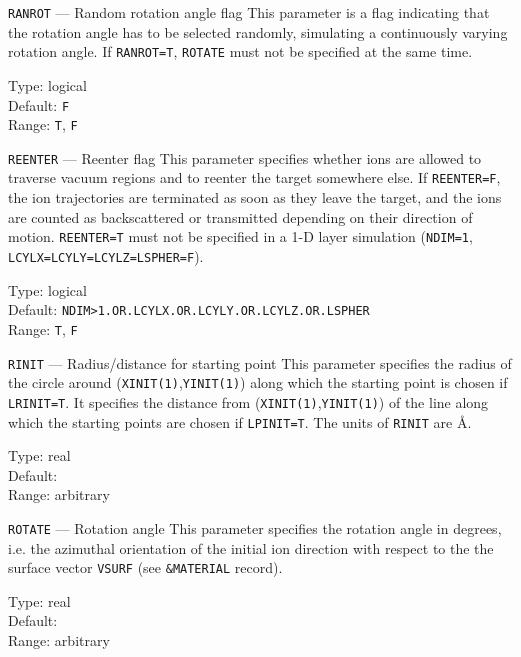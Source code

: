 \begin{keydescription}{\texttt{RANROT} --- Random rotation angle flag}
%
  This parameter is a flag indicating that the rotation angle has to be
  selected randomly, simulating a continuously varying rotation angle.
  If \texttt{RANROT=T}, \texttt{ROTATE} must not be specified at the
  same time.
%
  \begin{keytab}
    Type:    \> logical \\
    Default: \> \texttt{F} \\
    Range:   \> \texttt{T}, \texttt{F}
  \end{keytab}
\end{keydescription}

\begin{keydescription}{\texttt{REENTER} --- Reenter flag}
%
  This parameter specifies whether ions are allowed to traverse 
  vacuum regions and to reenter the target somewhere else. If
  \texttt{REENTER=F}, the ion trajectories are terminated as soon
  as they leave the target, and the ions are counted as backscattered or
  transmitted depending on their direction of motion. \texttt{REENTER=T} 
  must not be specified in a 1-D layer simulation (\texttt{NDIM=1},
  \texttt{LCYLX=LCYLY=LCYLZ=LSPHER=F}).
%
  \begin{keytab}
    Type:    \> logical \\
    Default: \>
    \texttt{NDIM>1.OR.LCYLX.OR.LCYLY.OR.LCYLZ.OR.LSPHER} \\
    Range:   \> \texttt{T}, \texttt{F}
  \end{keytab}
\end{keydescription}

\ifprivate
\begin{keydescription}{\texttt{RINIT} --- Radius/distance for starting point}
%
  This parameter specifies the radius of the circle around
  (\texttt{XINIT(1)},\texttt{YINIT(1)}) along which the starting point is
  chosen if \texttt{LRINIT=T}. It specifies the distance from
  (\texttt{XINIT(1)},\texttt{YINIT(1)}) of the line along which the starting
  points are chosen if \texttt{LPINIT=T}. The units of \texttt{RINIT}
  are \AA.
%
  \begin{keytab}
    Type:    \> real \\
    Default:  \\
    Range:   \> arbitrary
  \end{keytab}
\end{keydescription}
\fi

\begin{keydescription}{\texttt{ROTATE} --- Rotation angle}
%
  This parameter specifies the rotation angle in degrees, i.e. the
  azimuthal orientation of the initial ion direction with respect to
  the the surface vector \texttt{VSURF} (see \texttt{\&MATERIAL} record).
\begin{keytab}
   Type:    \> real \\
   Default:  \\
   Range:   \> arbitrary
\end{keytab}
\end{keydescription}

